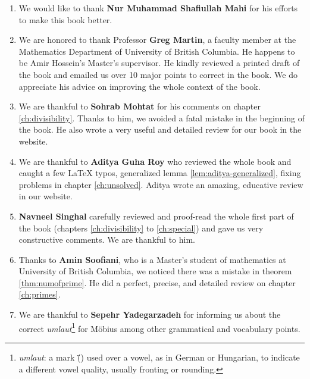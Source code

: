 \documentclass[12pt]{book}
\begin{document}
\begin{enumerate}
		\item We would like to thank \textbf{Nur Muhammad Shafiullah Mahi} for his efforts to make this book better.
		
		\item We are honored to thank Professor \textbf{Greg Martin}, a faculty member at the Mathematics Department of University of British Columbia. He happens to be Amir Hossein's Master's supervisor. He kindly reviewed a printed draft of the book and emailed us over 10 major points to correct in the book. We do appreciate his advice on improving the whole context of the book.
		
		\item We are thankful to \textbf{Sohrab Mohtat} for his comments on chapter \ref{ch:divisibility}. Thanks to him, we avoided a fatal mistake in the beginning of the book. He also wrote a very useful and detailed review for our book in the website.


		\item We are thankful to \textbf{Aditya Guha Roy} who reviewed the whole book and caught a few LaTeX typos, generalized lemma \eqref{lem:aditya-generalized}, fixing problems in chapter \ref{ch:unsolved}. Aditya wrote an amazing, educative review in our website.
		\item \textbf{Navneel Singhal} carefully reviewed and proof-read the whole first part of the book (chapters \ref{ch:divisibility} to \ref{ch:special}) and gave us very constructive comments. We are thankful to him.
				
		\item Thanks to \textbf{Amin Soofiani}, who is a Master's student of mathematics at University of British Columbia, we noticed there was a mistake in theorem \eqref{thm:numofprime}. He did a perfect, precise, and detailed review on chapter \ref{ch:primes}. 
		
		\item We are thankful to \textbf{Sepehr Yadegarzadeh} for informing us about the correct \textit{umlaut}\footnote{\textit{umlaut}: a mark (\"{}) used over a vowel, as in German or Hungarian, to indicate a different vowel quality, usually fronting or rounding.} for M\"{o}bius among other grammatical and vocabulary points.
	\end{enumerate}
	
\tableofcontents


\pagestyle{myfancy}
		\pagestyle{fancy}
\mainmatter
\setcounter{page}{13}
	
		
		
		
		
		

		
		
		
\backmatter
\pagestyle{empty}

\printbibliography
\end{document}
